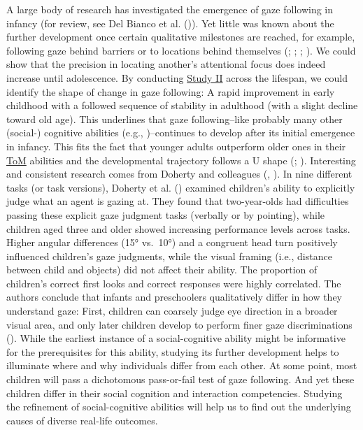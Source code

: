 \documentclass[
]{scrbook}
\begin{document}
A large body of research has investigated the emergence of gaze following in infancy (for review, see Del Bianco et al. ()). Yet little was known about the further development once certain qualitative milestones are reached, for example, following gaze behind barriers or to locations behind themselves (; ; ; ). We could show that the precision in locating another's attentional focus does indeed increase until adolescence. By conducting \hyperref[studyII]{Study II} across the lifespan, we could identify the shape of change in gaze following: A rapid improvement in early childhood with a followed sequence of stability in adulthood (with a slight decline toward old age). This underlines that gaze following\thinspace --\thinspace like probably many other (social-) cognitive abilities (e.g., )\thinspace --\thinspace continues to develop after its initial emergence in infancy. This fits the fact that younger adults outperform older ones in their \hyperref[acronyms_ToM]{ToM} abilities and the developmental trajectory follows a U shape (; ). Interesting and consistent research comes from Doherty and colleagues (, ). In nine different tasks (or task versions), Doherty et al. () examined children's ability to explicitly judge what an agent is gazing at. They found that two-year-olds had difficulties passing these explicit gaze judgment tasks (verbally or by pointing), while children aged three and older showed increasing performance levels across tasks. Higher angular differences (15° vs.~10°) and a congruent head turn positively influenced children's gaze judgments, while the visual framing (i.e., distance between child and objects) did not affect their ability. The proportion of children's correct first looks and correct responses were highly correlated. The authors conclude that infants and preschoolers qualitatively differ in how they understand gaze: First, children can coarsely judge eye direction in a broader visual area, and only later children develop to perform finer gaze discriminations (). While the earliest instance of a social-cognitive ability might be informative for the prerequisites for this ability, studying its further development helps to illuminate where and why individuals differ from each other. At some point, most children will pass a dichotomous pass-or-fail test of gaze following. And yet these children differ in their social cognition and interaction competencies. Studying the refinement of social-cognitive abilities will help us to find out the underlying causes of diverse real-life outcomes.
\end{document}
